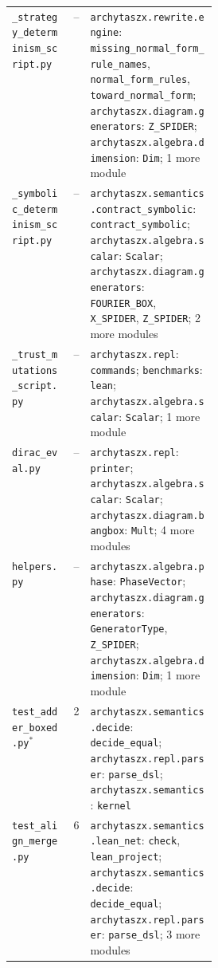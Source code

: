 \begin{xltabular}{\linewidth}{@{}>{\raggedright\arraybackslash}p{0.3\linewidth}r>{\raggedright\arraybackslash}X@{}}
\texttt{\_\allowbreak{}strategy\_\allowbreak{}determinism\_\allowbreak{}script.py} & -- & \texttt{archytaszx.\allowbreak{}rewrite.\allowbreak{}engine}: \texttt{missing\_\allowbreak{}normal\_\allowbreak{}form\_\allowbreak{}rule\_\allowbreak{}names}, \texttt{normal\_\allowbreak{}form\_\allowbreak{}rules}, \texttt{toward\_\allowbreak{}normal\_\allowbreak{}form}; \texttt{archytaszx.\allowbreak{}diagram.\allowbreak{}generators}: \texttt{Z\_\allowbreak{}SPIDER}; \texttt{archytaszx.\allowbreak{}algebra.\allowbreak{}dimension}: \texttt{Dim}; 1 more module \\
\texttt{\_\allowbreak{}symbolic\_\allowbreak{}determinism\_\allowbreak{}script.py} & -- & \texttt{archytaszx.\allowbreak{}semantics.\allowbreak{}contract\_\allowbreak{}symbolic}: \texttt{contract\_\allowbreak{}symbolic}; \texttt{archytaszx.\allowbreak{}algebra.\allowbreak{}scalar}: \texttt{Scalar}; \texttt{archytaszx.\allowbreak{}diagram.\allowbreak{}generators}: \texttt{FOURIER\_\allowbreak{}BOX}, \texttt{X\_\allowbreak{}SPIDER}, \texttt{Z\_\allowbreak{}SPIDER}; 2 more modules \\
\texttt{\_\allowbreak{}trust\_\allowbreak{}mutations\_\allowbreak{}script.py} & -- & \texttt{archytaszx.\allowbreak{}repl}: \texttt{commands}; \texttt{benchmarks}: \texttt{lean}; \texttt{archytaszx.\allowbreak{}algebra.\allowbreak{}scalar}: \texttt{Scalar}; 1 more module \\
\texttt{dirac\_\allowbreak{}eval.py} & -- & \texttt{archytaszx.\allowbreak{}repl}: \texttt{printer}; \texttt{archytaszx.\allowbreak{}algebra.\allowbreak{}scalar}: \texttt{Scalar}; \texttt{archytaszx.\allowbreak{}diagram.\allowbreak{}bangbox}: \texttt{Mult}; 4 more modules \\
\texttt{helpers.py} & -- & \texttt{archytaszx.\allowbreak{}algebra.\allowbreak{}phase}: \texttt{PhaseVector}; \texttt{archytaszx.\allowbreak{}diagram.\allowbreak{}generators}: \texttt{GeneratorType}, \texttt{Z\_\allowbreak{}SPIDER}; \texttt{archytaszx.\allowbreak{}algebra.\allowbreak{}dimension}: \texttt{Dim}; 1 more module \\
\texttt{test\_\allowbreak{}adder\_\allowbreak{}boxed.py}$^{\ast}$ & 2 & \texttt{archytaszx.\allowbreak{}semantics.\allowbreak{}decide}: \texttt{decide\_\allowbreak{}equal}; \texttt{archytaszx.\allowbreak{}repl.\allowbreak{}parser}: \texttt{parse\_\allowbreak{}dsl}; \texttt{archytaszx.\allowbreak{}semantics}: \texttt{kernel} \\
\texttt{test\_\allowbreak{}align\_\allowbreak{}merge.py} & 6 & \texttt{archytaszx.\allowbreak{}semantics.\allowbreak{}lean\_\allowbreak{}net}: \texttt{check}, \texttt{lean\_\allowbreak{}project}; \texttt{archytaszx.\allowbreak{}semantics.\allowbreak{}decide}: \texttt{decide\_\allowbreak{}equal}; \texttt{archytaszx.\allowbreak{}repl.\allowbreak{}parser}: \texttt{parse\_\allowbreak{}dsl}; 3 more modules \\

\end{xltabular}
